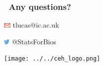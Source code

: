 \documentclass[handout, aspectratio = 169]{beamer}
\begin{document}
\begin{frame}

\frametitle{\insertframenumber~Any questions?}

\vspace{5mm}


\vspace{4mm}

\includegraphics[height=7pt]{Ar_Icon_Contact.pdf} tlucas{\footnotesize{@}}ic.ac.uk

\includegraphics[height=7pt]{Twitter_logo_blue-small.png} {\footnotesize{@}}StatsForBios

\vspace{2cm}
\hfill %
\texttt{[image: ../../ceh\_logo.png]}

\end{frame}




 
 
\end{document}
